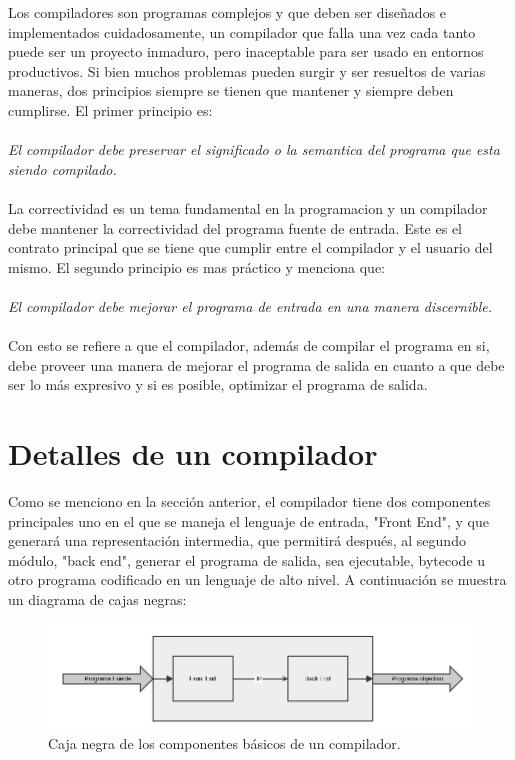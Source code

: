\documentclass[fleqn]{tcdl}
\begin{document}
Los compiladores son programas complejos y que deben ser diseñados e implementados cuidadosamente, un compilador que falla una vez cada tanto puede ser un proyecto inmaduro, pero inaceptable para ser usado en entornos productivos. Si bien muchos problemas pueden surgir y ser resueltos de varias maneras, dos principios siempre se tienen que mantener y siempre deben cumplirse. El primer principio es:
\\\\
\textit{El compilador debe preservar el significado o la semantica del programa que esta siendo compilado.}
\\\\
La correctividad es un tema fundamental en la programacion y un compilador debe mantener la correctividad del programa fuente de entrada. Este es el contrato principal que se tiene que cumplir entre el compilador y el usuario del mismo. 
El segundo principio es mas práctico y menciona que:
\\\\
\textit{El compilador debe mejorar el programa de entrada en una manera discernible.}
\\\\
Con esto se refiere a que el compilador, además de compilar el programa en si, debe proveer una manera de mejorar el programa de salida en cuanto a que debe ser lo más expresivo y si es posible, optimizar el programa de salida.

\newpage
\section*{Detalles de un compilador}
\fontsize{11}{14}\selectfont

Como se menciono en la sección anterior, el compilador tiene dos componentes principales uno en el que se maneja el lenguaje de entrada, "Front End", y que generará una representación intermedia, que permitirá después, al segundo módulo, "back end", generar el programa de salida, sea ejecutable, bytecode u otro programa codificado en un lenguaje de alto nivel. A continuación se muestra un diagrama de cajas negras:

\begin{figure}[h]
\captionsetup{type=figure}
\includegraphics[width=\textwidth]{compilador_detallado.png}
\caption{\label{fig:inter}Caja negra de los componentes básicos de un compilador.}
\end{figure}
\end{document}
